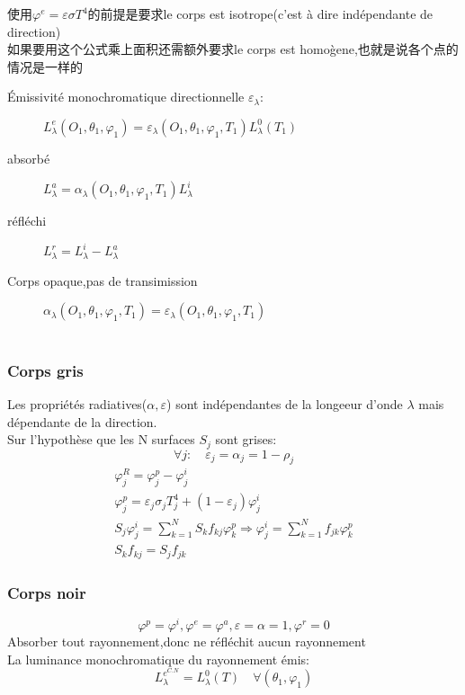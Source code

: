 使用$\varphi^e=\varepsilon \sigma T^4$的前提是要求le corps est isotrope(c'est \`a dire ind\'ependante de direction)\\
如果要用这个公式乘上面积还需额外要求le corps est homo\`gene,也就是说各个点的情况是一样的

\begin{description}
\item [\'Emissivit\'e monochromatique directionnelle $\varepsilon_{\lambda}$:] $L_{\lambda }^e(O_1,\theta_1,\varphi_1) = \varepsilon_{\lambda }(O_1,\theta_1,\varphi_1,T_1)L_{\lambda }^0(T_1)$
\item [absorb\'e]  $L_{\lambda}^a =\alpha_{\lambda }(O_1,\theta_1,\varphi_1,T_1)L_{\lambda}^i $
\item [r\'efl\'echi]  $L_{\lambda}^r = L_{\lambda}^i - L_{\lambda}^a$
\item [Corps opaque,pas de transimission] $\alpha_{\lambda }(O_1,\theta_1,\varphi_1,T_1)=\varepsilon_{\lambda }(O_1,\theta_1,\varphi_1,T_1)$
\end{description}

\begin{eqnarray}
\end{eqnarray}

\subsubsection{Corps gris}
Les propri\'et\'es radiatives($\alpha,\varepsilon$) sont ind\'ependantes de la longeeur d'onde $\lambda $ mais d\'ependante de la direction.\\
Sur l'hypoth\`ese que les N surfaces $S_j$ sont grises:
$$\forall j: \quad \varepsilon_j =\alpha_j = 1- \rho_j$$
\begin{eqnarray}
\varphi_j^R=\varphi_j^p - \varphi_j^i \\
\varphi_j^p = \varepsilon_j \sigma_j T_j^4 +(1-\varepsilon_j)\varphi_j^i\\
S_j \varphi_j^i = \sum_{k=1}^N S_k f_{kj}\varphi_k^p \Rightarrow \varphi_j^i = \sum_{k=1}^N f_{jk}\varphi_k^p\\
S_k f_{kj}=S_j f_{jk}
\end{eqnarray}
\subsubsection{Corps noir}
$$\varphi^p = \varphi^i,\varphi^e = \varphi^a,\varepsilon=\alpha=1,\varphi^r=0$$
Absorber tout rayonnement,donc ne r\'efl\'echit aucun rayonnement \\
La luminance monochromatique du rayonnement \'emis:
$$L_{\lambda}^{e^{C.N}}= L_{\lambda}^0(T) \quad \forall(\theta_1,\varphi_1)$$

